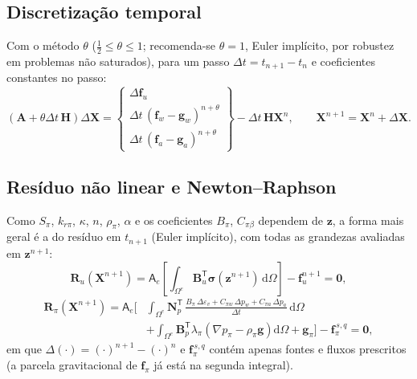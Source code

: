 \documentclass[11pt,a4paper]{article}
\numberwithin{equation}{section}
\newcommand{\dd}{\mathrm{d}}
\begin{document}
\subsection{Discretização temporal}

Com o método $\theta$ ($\tfrac12\leq\theta\leq1$; recomenda-se $\theta=1$,
Euler implícito, por robustez em problemas não saturados), para um passo
$\Delta t=t_{n+1}-t_n$ e coeficientes constantes no passo:
\begin{equation}
\boxed{\left(\mathbf A+\theta\Delta t\,\mathbf H\right)\Delta\mathbf X
=\begin{Bmatrix}\Delta\mathbf f_u\\ \Delta t\,(\mathbf f_w-\mathbf g_w)^{n+\theta}\\ \Delta t\,(\mathbf f_a-\mathbf g_a)^{n+\theta}\end{Bmatrix}
-\Delta t\,\mathbf H\mathbf X^{n},
\qquad \mathbf X^{n+1}=\mathbf X^{n}+\Delta\mathbf X.}
\end{equation}

\subsection{Resíduo não linear e Newton--Raphson}

Como $S_\pi$, $k_{r\pi}$, $\kappa$, $n$, $\rho_\pi$, $\alpha$ e os coeficientes
$B_\pi$, $C_{\pi\beta}$ dependem de $\mathbf z$, a forma mais geral é
a do resíduo em $t_{n+1}$ (Euler implícito), com todas as grandezas
avaliadas em $\mathbf z^{n+1}$:
\begin{equation}
\boxed{\mathbf R_u(\mathbf X^{n+1})=\mathsf A_e\!\left[
\int_{\Omega^e}\mathbf B_u^{\mathsf T}\boldsymbol\sigma(\mathbf z^{n+1})\,\dd\Omega\right]
-\mathbf f_u^{n+1}=\mathbf 0,}
\end{equation}
\begin{equation}
\boxed{\begin{aligned}
\mathbf R_\pi(\mathbf X^{n+1})=\mathsf A_e\Bigg[
&\int_{\Omega^e}\mathbf N_p^{\mathsf T}\,
\frac{B_\pi\,\Delta\varepsilon_v+C_{\pi w}\,\Delta p_w+C_{\pi a}\,\Delta p_a}{\Delta t}\,\dd\Omega\\
&+\int_{\Omega^e}\mathbf B_p^{\mathsf T}\lambda_\pi\left(\nabla p_\pi-\rho_\pi\mathbf g\right)\dd\Omega
+\mathbf g_\pi\Bigg]
-\mathbf f_\pi^{\,s,q}=\mathbf 0,
\end{aligned}}
\end{equation}
em que $\Delta(\cdot)=(\cdot)^{n+1}-(\cdot)^n$ e $\mathbf f_\pi^{\,s,q}$
contém apenas fontes e fluxos prescritos (a parcela gravitacional de
$\mathbf f_\pi$ já está na segunda integral).
\end{document}
